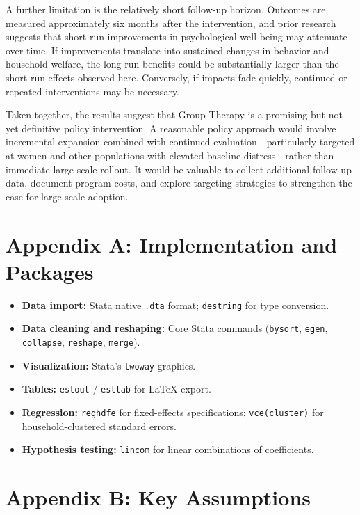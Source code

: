 \documentclass[12pt]{article}
\begin{document}
A further limitation is the relatively short follow-up horizon. Outcomes are measured approximately six months after the intervention, and prior research suggests that short-run improvements in psychological well-being may attenuate over time. If improvements translate into sustained changes in behavior and household welfare, the long-run benefits could be substantially larger than the short-run effects observed here. Conversely, if impacts fade quickly, continued or repeated interventions may be necessary.

Taken together, the results suggest that Group Therapy is a promising but not yet definitive policy intervention. A reasonable policy approach would involve incremental expansion combined with continued evaluation---particularly targeted at women and other populations with elevated baseline distress---rather than immediate large-scale rollout. It would be valuable to collect additional follow-up data, document program costs, and explore targeting strategies to strengthen the case for large-scale adoption.


\newpage
\appendix

\section*{Appendix A: Implementation and Packages}

\begin{itemize}
  \item \textbf{Data import:} Stata native \texttt{.dta} format; \texttt{destring} for type conversion.
  \item \textbf{Data cleaning and reshaping:} Core Stata commands (\texttt{bysort}, \texttt{egen}, \texttt{collapse}, \texttt{reshape}, \texttt{merge}).
  \item \textbf{Visualization:} Stata's \texttt{twoway} graphics.
  \item \textbf{Tables:} \texttt{estout} / \texttt{esttab} for \LaTeX{} export.
  \item \textbf{Regression:} \texttt{reghdfe} for fixed-effects specifications; \texttt{vce(cluster)} for household-clustered standard errors.
  \item \textbf{Hypothesis testing:} \texttt{lincom} for linear combinations of coefficients.
\end{itemize}


\section*{Appendix B: Key Assumptions}
\end{document}
